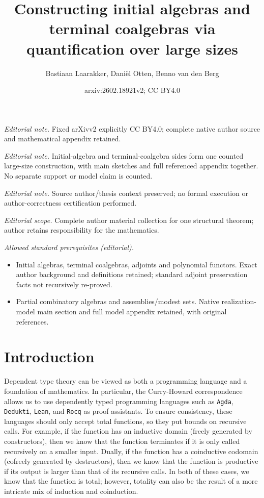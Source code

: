 \documentclass[10pt,a4paper]{article}
\title{Constructing initial algebras and terminal coalgebras via quantification over large sizes}
\author{Bastiaan Laarakker, Daniël Otten, Benno van den Berg}
\date{arxiv:2602.18921v2; CC BY4.0}
\theoremstyle{definition}
\theoremstyle{remark}
\renewcommand{\.}{.\,} %
\renewcommand{\:}{:} %
\newcommand{\0}{\mathbf{0}}
\newcommand{\1}{\mathbf{1}}
\newcommand\<\langle
\renewcommand\>\rangle
\theoremstyle{remark}
\begin{document}
\maketitle
\noindent\textit{Editorial note.} Fixed arXivv2 explicitly CC BY4.0; complete native author source and mathematical appendix retained.\par\medskip
\noindent\textit{Editorial note.} Initial-algebra and terminal-coalgebra sides form one counted large-size construction, with main sketches and full referenced appendix together. No separate support or model claim is counted.\par\medskip
\noindent\textit{Editorial note.} Source author/thesis context preserved; no formal execution or author-correctness certification performed.\par\medskip
\noindent\textit{Editorial scope.} Complete author material collection for one structural theorem; author retains responsibility for the mathematics.\par\medskip
\noindent\textit{Allowed standard prerequisites (editorial).}\begin{itemize}
\item Initial algebras, terminal coalgebras, adjoints and polynomial functors. Exact author background and definitions retained; standard adjoint preservation facts not recursively re-proved.
\item Partial combinatory algebras and assemblies/modest sets. Native realization-model main section and full model appendix retained, with original references.
\end{itemize}\medskip
\section{Introduction}
    \label{sec:intro}
    
Dependent type theory can be viewed as both a programming language and a foundation of mathematics.
In particular, the Curry-Howard correspondence allows us to use dependently typed programming languages such as \texttt{Agda}, \texttt{Dedukti}, \texttt{Lean}, and \texttt{Rocq} as proof assistants.
To ensure consistency, these languages should only accept total functions, so they put bounds on recursive calls.
For example, if the function has an inductive domain (freely generated by constructors), then we know that the function terminates if it is only called recursively on a smaller input.
Dually, if the function has a coinductive codomain (cofreely generated by destructors), then we know that the function is productive if its output is larger than that of its recursive calls.
In both of these cases, we know that the function is total; however, totality can also be the result of a more intricate mix of induction and coinduction.
\end{document}

